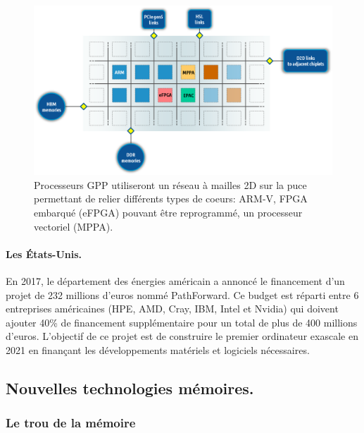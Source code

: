     \begin{figure}
        \center
        \includegraphics[width=14cm]{images/edl_epi_processor.png}
        \caption{\label{fig:edl_epi_processor} Processeurs GPP utiliseront un réseau à mailles 2D sur la puce permettant de relier différents types de coeurs: ARM-V, FPGA embarqué (eFPGA) pouvant être reprogrammé, un processeur vectoriel (MPPA).}
    \end{figure}
    
    
    \paragraph{Les États-Unis.}
    En 2017, le département des énergies américain a annoncé le financement d'un projet de 232 millions d'euros nommé PathForward. Ce budget est réparti entre 6 entreprises américaines (HPE, AMD, Cray, IBM, Intel et Nvidia) qui doivent ajouter 40\% de financement supplémentaire pour un total de plus de 400 millions d'euros. L'objectif de ce projet est de construire le premier ordinateur \gls{exascale} en 2021 en finançant les développements matériels et logiciels nécessaires.


        


\subsection{Nouvelles technologies mémoires.}\label{sec:oppo_new_memory}

    \subsubsection{Le trou de la mémoire}
    
